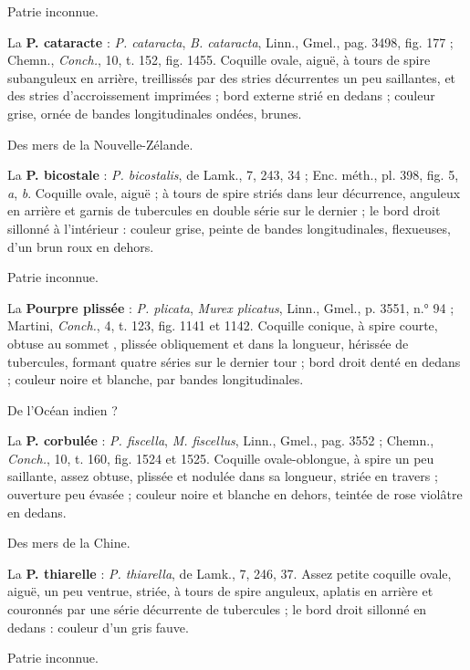 \documentclass[a4paper, 11pt, oneside, polutonikogreek, french]{article}
\begin{document}
Patrie inconnue.

La \textbf{P. cataracte} : \emph{P. cataracta}, \emph{B. cataracta}, Linn., Gmel., pag. 3498, fig. 177 ; Chemn., \emph{Conch.}, 10, t. 152, fig. 1455. Coquille ovale, aiguë, à tours de spire subanguleux en arrière, treillissés par des stries décurrentes un peu saillantes, et des stries d'accroissement imprimées ; bord externe strié en dedans ; couleur grise, ornée de bandes longitudinales ondées, brunes.

Des mers de la Nouvelle-Zélande.

\bigskip

La \textbf{P. bicostale} : \emph{P. bicostalis}, de Lamk., 7, 243, 34 ; Enc. méth., pl. 398, fig. 5, \emph{a}, \emph{b}. Coquille ovale, aiguë ; à tours de spire striés dans leur décurrence, anguleux en arrière et garnis de tubercules en double série sur le dernier ; le bord droit sillonné à l'intérieur : couleur grise, peinte de bandes longitudinales, flexueuses, d'un brun roux en dehors.

Patrie inconnue.

\bigskip

La \textbf{Pourpre plissée} : \emph{P. plicata}, \emph{Murex plicatus}, Linn., Gmel., p. 3551, n.° 94 ; Martini, \emph{Conch.}, 4, t. 123, fig. 1141 et 1142. Coquille conique, à spire courte, obtuse au sommet , plissée obliquement et dans la longueur, hérissée de tubercules, formant quatre séries sur le dernier tour ; bord droit denté en dedans ; couleur noire et blanche, par bandes longitudinales.

De l'Océan indien ?

\bigskip

La \textbf{P. corbulée} : \emph{P. fiscella}, \emph{M. fiscellus}, Linn., Gmel., pag. 3552 ; Chemn., \emph{Conch.}, 10, t. 160, fig. 1524 et 1525. Coquille ovale-oblongue, à spire un peu saillante, assez obtuse, plissée et nodulée dans sa longueur, striée en travers ; ouverture peu évasée ; couleur noire et blanche en dehors, teintée de rose violâtre en dedans.

Des mers de la Chine.

\bigskip

La \textbf{P. thiarelle} : \emph{P. thiarella}, de Lamk., 7, 246, 37. Assez petite coquille ovale, aiguë, un peu ventrue, striée, à tours de spire anguleux, aplatis en arrière et couronnés par une série décurrente de tubercules ; le bord droit sillonné en dedans : couleur d'un gris fauve.

Patrie inconnue.
\end{document}
